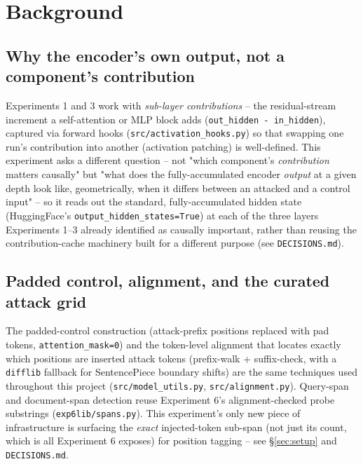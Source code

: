 \documentclass[11pt]{article}
\begin{document}
\section{Background}

\subsection{Why the encoder's own output, not a component's contribution}

Experiments 1 and 3 work with \emph{sub-layer contributions} -- the
residual-stream increment a self-attention or MLP block adds
(\texttt{out\_hidden - in\_hidden}), captured via forward hooks
(\texttt{src/activation\_hooks.py}) so that swapping one run's contribution
into another (activation patching) is well-defined. This experiment asks a
different question -- not "which component's \emph{contribution} matters
causally" but "what does the fully-accumulated encoder \emph{output} at a
given depth look like, geometrically, when it differs between an attacked
and a control input" -- so it reads out the standard, fully-accumulated
hidden state (HuggingFace's \texttt{output\_hidden\_states=True}) at each
of the three layers Experiments 1--3 already identified as causally
important, rather than reusing the contribution-cache machinery built for
a different purpose (see \texttt{DECISIONS.md}).

\subsection{Padded control, alignment, and the curated attack grid}

The padded-control construction (attack-prefix positions replaced with pad
tokens, \texttt{attention\_mask=0}) and the token-level alignment that
locates exactly which positions are inserted attack tokens (prefix-walk +
suffix-check, with a \texttt{difflib} fallback for SentencePiece boundary
shifts) are the same techniques used throughout this project
(\texttt{src/model\_utils.py}, \texttt{src/alignment.py}). Query-span and
document-span detection reuse Experiment 6's alignment-checked probe
substrings (\texttt{exp6lib/spans.py}). This experiment's only new piece of
infrastructure is surfacing the \emph{exact} injected-token sub-span (not
just its count, which is all Experiment 6 exposes) for position tagging --
see \S\ref{sec:setup} and \texttt{DECISIONS.md}.
\end{document}
